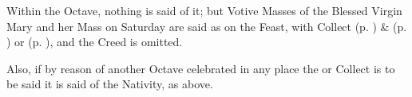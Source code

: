 \begin{rubric}
    Within the Octave, nothing is said of it; but Votive Masses of the Blessed Virgin Mary and her Mass on Saturday are said as on the Feast, with   Collect  (p. \pageref{SPHolyGhost}) \&   (p. \pageref{SPAgainst}) or  (p. \pageref{SPChiefBishop}), and the Creed is omitted.
\end{rubric}
\begin{rubric}
    Also, if by reason of another Octave celebrated in any place the  or  Collect is to be said  it is said of the Nativity, as above.
\end{rubric}




